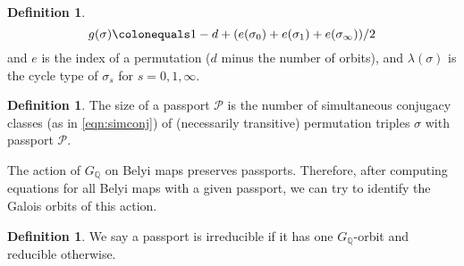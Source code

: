 \documentclass{dcthesis}
\newcommand{\QQ}{\mathbb Q}
\newcommand{\defi}[1]{\textsf{#1}}
\theoremstyle{definition}
\newtheorem{definition}[prop]{Definition}
\theoremstyle{remark}
\numberwithin{equation}{section}
\numberwithin{figure}{section}
\begin{document}
{{{\begin{definition}
\begin{equation}
          g(\sigma) \colonequals 1-d+(e(\sigma_0)+e(\sigma_1)+e(\sigma_\infty))/2
        \end{equation}
        and $e$ is the index of a permutation ($d$ minus the number of orbits), and
        $\lambda(\sigma)$ is the cycle type of $\sigma_s$ for $s=0,1,\infty$.
      \end{definition}
      \begin{definition}
        \label{def:passportsize}
        The
        \defi{size} of a passport $\mathcal{P}$ is the number of simultaneous conjugacy
        classes (as in \ref{eqn:simconj}) of (necessarily transitive) permutation
        triples $\sigma$ with passport $\mathcal{P}$.
      \end{definition}
      The action of $G_\QQ$ on Belyi maps preserves passports.
      Therefore, after computing equations for all Belyi maps with a given
      passport, we can try to identify the Galois orbits of this action.
      \begin{definition}
        \label{def:reduciblepassport}
        We say a passport is \defi{irreducible} if it has one
        $G_\QQ$-orbit and
        \defi{reducible} otherwise.
      \end{definition}
    }
}}
\end{document}
